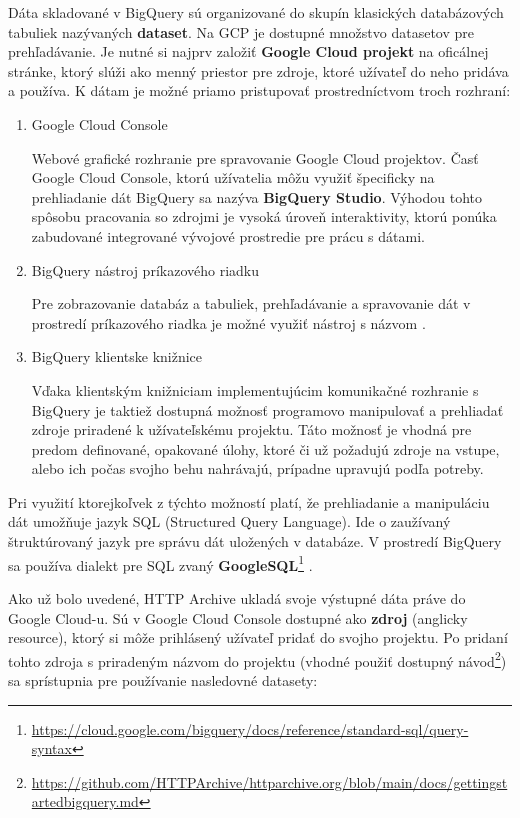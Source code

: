 Dáta skladované v BigQuery sú organizované do skupín klasických databázových tabuliek nazývaných \textbf{dataset}.
Na GCP je dostupné množstvo datasetov pre prehľadávanie.
Je nutné si najprv založiť \textbf{Google Cloud projekt} na oficálnej stránke, ktorý slúži ako menný priestor pre zdroje, ktoré užívateľ do neho pridáva a používa.
K dátam je možné priamo pristupovať prostredníctvom troch rozhraní: \cite{google-cloud} 
\begin{enumerate}
    \item Google Cloud Console

    Webové grafické rozhranie pre spravovanie Google Cloud projektov. 
    Časť Google Cloud Console, ktorú užívatelia môžu využiť špecificky na prehliadanie dát BigQuery sa nazýva \textbf{BigQuery Studio}.
    Výhodou tohto spôsobu pracovania so zdrojmi je vysoká úroveň interaktivity, ktorú ponúka zabudované integrované vývojové prostredie pre prácu s dátami. 
    
    \item BigQuery nástroj príkazového riadku

    Pre zobrazovanie databáz a tabuliek, prehľadávanie a spravovanie dát v prostredí príkazového riadka je možné využiť nástroj s názvom \textbf{}. 
    
    \item BigQuery klientske knižnice

    Vďaka klientským knižniciam implementujúcim komunikačné rozhranie s BigQuery je taktiež dostupná možnosť programovo manipulovať a prehliadať zdroje priradené k užívateľskému projektu.
    Táto možnosť je vhodná pre predom definované, opakované úlohy, ktoré či už požadujú zdroje na vstupe, alebo ich počas svojho behu nahrávajú, prípadne upravujú podľa potreby.
\end{enumerate}

Pri využití ktorejkoľvek z týchto možností platí, že prehliadanie a manipuláciu dát umožňuje jazyk SQL (Structured Query Language).
Ide o zaužívaný štruktúrovaný jazyk pre správu dát uložených v databáze.
V prostredí BigQuery sa používa dialekt pre SQL zvaný \textbf{GoogleSQL}\footnote{\href{https://cloud.google.com/bigquery/docs/reference/standard-sql/query-syntax}{https://cloud.google.com/bigquery/docs/reference/standard-sql/query-syntax}} \cite{google-bq}.

\pagebreak

Ako už bolo uvedené, HTTP Archive ukladá svoje výstupné dáta práve do Google Cloud-u.
Sú v Google Cloud Console dostupné ako \textbf{zdroj} (anglicky resource), ktorý si môže prihlásený užívateľ pridať do svojho projektu.
Po pridaní tohto zdroja s priradeným názvom  do projektu (vhodné použiť dostupný návod\footnote{\href{https://github.com/HTTPArchive/httparchive.org/blob/main/docs/gettingstarted\_bigquery.md}{https://github.com/HTTPArchive/httparchive.org/blob/main/docs/gettingstarted\textunderscore bigquery.md}}) sa sprístupnia pre používanie nasledovné datasety: \cite{httparchive-repo}


